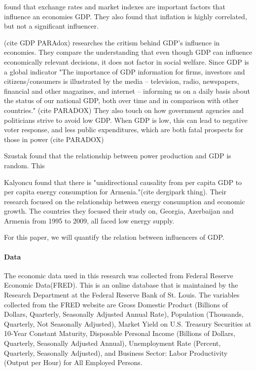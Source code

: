 \documentclass[12pt]{article}
\begin{document}
\citet{divya2014study} found that exchange rates and market indexes are important factors that influence an economies GDP. They also found that inflation is highly correlated, but not a significant influencer.  

(cite GDP PARAdox) researches the critism behind GDP's influence in economies. They compare the understanding that even though GDP can influence economically relevant decisions, it does not factor in social welfare. 
Since GDP is a global indicator "The importance of GDP information for firms, investors and citizens/consumers is illustrated by the media – television, radio, newspapers, financial and other magazines, and internet – informing us on a daily basis about the status of our national GDP, both over time and in comparison with other countries." (cite PARADOX)
They also touch on how government agencies and politicians strive to avoid low GDP. When GDP is low, this can lead to negative voter response, and less public expenditures, which are both fatal prospects for those in power (cite PARADOX) 



Szustak found that the relationship between power production and GDP is random. This 



Kalyoncu found that there is "unidirectional causality from per capita GDP to per capita energy consumption for Armenia."(cite dergipark thing). Their research focused on the relationship between energy consumption and economic growth.
The countries they focused their study on, Georgia, Azerbaijan and Armenia from 1995 to 2009, all faced low energy supply. 

For this paper, we will quantify the relation between influencers of GDP. 






\paragraph{Data}

The economic data used in this research was collected from Federal Reserve Economic Data(FRED). 
This is an online database that is maintained by the Research Department at the Federal Reserve Bank of St. Louis. 
The variables collected from the FRED website are Gross Domestic Product (Billions of Dollars, Quarterly, Seasonally Adjusted Annual Rate), Population (Thousands, Quarterly, Not Seasonally Adjusted), Market Yield on U.S. Treasury Securities at 10-Year Constant Maturity, Disposable Personal Income (Billions of Dollars, Quarterly, Seasonally Adjusted Annual), Unemployment Rate (Percent, Quarterly, Seasonally Adjusted), and Business Sector: Labor Productivity (Output per Hour) for All Employed Persons. 
\end{document}
